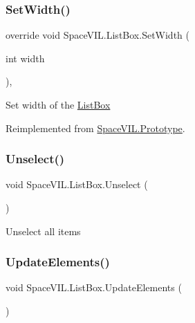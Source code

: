 \subsubsection{\texorpdfstring{Set\+Width()}{SetWidth()}}
{\footnotesize\ttfamily override void Space\+V\+I\+L.\+List\+Box.\+Set\+Width (\begin{DoxyParamCaption}\item[{int}]{width }\end{DoxyParamCaption})\hspace{0.3cm}{\ttfamily [inline]}, {\ttfamily [virtual]}}



Set width of the \mbox{\hyperlink{class_space_v_i_l_1_1_list_box}{List\+Box}} 



Reimplemented from \mbox{\hyperlink{class_space_v_i_l_1_1_prototype_a6a4f1b9581f4d18f1c3a3e287d4b2a2b}{Space\+V\+I\+L.\+Prototype}}.

\mbox{\label{class_space_v_i_l_1_1_list_box_abc68331993bf0f0c54775f309edfc83b}} 
\subsubsection{\texorpdfstring{Unselect()}{Unselect()}}
{\footnotesize\ttfamily void Space\+V\+I\+L.\+List\+Box.\+Unselect (\begin{DoxyParamCaption}{ }\end{DoxyParamCaption})\hspace{0.3cm}{\ttfamily [inline]}}



Unselect all items 

\mbox{\label{class_space_v_i_l_1_1_list_box_aeef6380f4eff45ac43737fbc42dcf2e1}} 
\subsubsection{\texorpdfstring{Update\+Elements()}{UpdateElements()}}
{\footnotesize\ttfamily void Space\+V\+I\+L.\+List\+Box.\+Update\+Elements (\begin{DoxyParamCaption}{ }\end{DoxyParamCaption})\hspace{0.3cm}{\ttfamily [inline]}}



